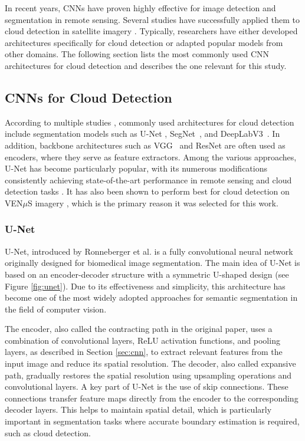 In recent years, CNNs have proven highly effective for image detection and segmentation in remote sensing. Several studies have successfully applied them to cloud detection in satellite imagery \cite{zhiwei2022, wang2024, pesek2022, wright2025, lopez2021, mohajerani2018}. Typically, researchers have either developed architectures specifically for cloud detection or adapted popular models from other domains. The following section lists the most commonly used CNN architectures for cloud detection and describes the one relevant for this study.

\subsection{CNNs for Cloud Detection}
\label{sec:cnn_cloud}

According to multiple studies \cite{zhiwei2022, wang2024, pesek2022, lopez2021, pang2023}, commonly used architectures for cloud detection include segmentation models such as U-Net \cite{ronneberger2015}, SegNet~\cite{badrinarayanan2016}, and DeepLabV3~\cite{chen2017}. In addition, backbone architectures such as VGG~\cite{simonyan2015} and ResNet \cite{he2015} are often used as encoders, where they serve as feature extractors. Among the various approaches, U-Net \cite{ronneberger2015} has become particularly popular, with its numerous modifications consistently achieving state-of-the-art performance in remote sensing and cloud detection tasks \cite{wang2024}. It has also been shown to perform best for cloud detection on VEN$\mu$S imagery \cite{pesek2022}, which is the primary reason it was selected for this work.

\subsubsection{U-Net}

U-Net, introduced by Ronneberger et al. \cite{ronneberger2015} is a fully convolutional neural network originally designed for biomedical image segmentation. The main idea of U-Net is based on an encoder-decoder structure with a symmetric U-shaped design (see Figure \ref{fig:unet}). Due to its effectiveness and simplicity, this architecture has become one of the most widely adopted approaches for semantic segmentation in the field of computer vision.

The encoder, also called the contracting path in the original paper, uses a combination of convolutional layers, ReLU activation functions, and pooling layers, as described in Section \ref{sec:cnn}, to extract relevant features from the input image and reduce its spatial resolution. The decoder, also called expansive path, gradually restores the spatial resolution using upsampling operations and convolutional layers. A key part of U-Net is the use of skip connections. These connections transfer feature maps directly from the encoder to the corresponding decoder layers. This helps to maintain spatial detail, which is particularly important in segmentation tasks where accurate boundary estimation is required, such as cloud detection.

